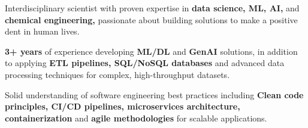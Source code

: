 

\begin{cvparagraph}
    \vspace{0.5cm}
    \begin{cvitemsfree}
        \item{Interdisciplinary scientist with proven expertise in \textbf{data science, ML, AI,} and \textbf{chemical engineering,} passionate about building solutions to make a positive dent in human lives.}

        \item{\textbf{3+ years} of experience developing \textbf{ML/DL} and \textbf{GenAI} solutions, in addition to applying \textbf{ETL pipelines, SQL/NoSQL databases} and advanced data processing techniques for complex, high-throughput datasets.}
        
        \item{Solid understanding of software engineering best practices including \textbf{Clean code principles,  CI/CD pipelines, microservices architecture, containerization} and \textbf{agile methodologies} for scalable applications.}


                
    \end{cvitemsfree}


\end{cvparagraph}
